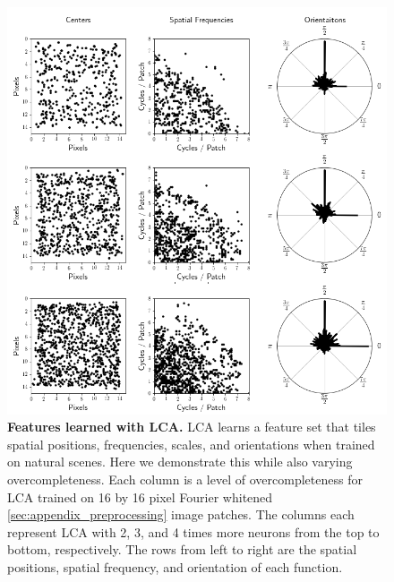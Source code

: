 \begin{figure}[h]\label{fig:ch2_lca_overcompleteness_tiling}
    \centering
    \includegraphics[width=\textwidth]{figures/lca_overcompleteness_location_frequency_centers.png}
    \caption{\textbf{Features learned with LCA.} LCA learns a feature set that tiles spatial positions, frequencies, scales, and orientations when trained on natural scenes. Here we demonstrate this while also varying overcompleteness. Each column is a level of overcompleteness for LCA trained on 16 by 16 pixel Fourier whitened \ref{sec:appendix_preprocessing} image patches. The columns each represent LCA with 2, 3, and 4 times more neurons from the top to bottom, respectively. The rows from left to right are the spatial positions, spatial frequency, and orientation of each function.}
\end{figure}

